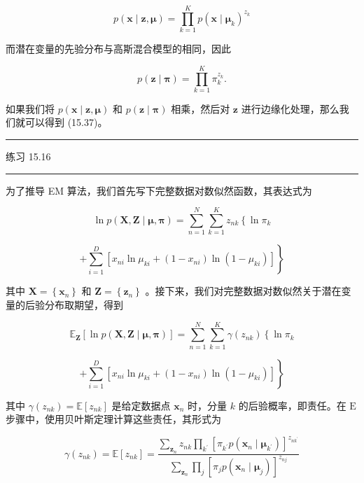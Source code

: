 \documentclass[10pt]{report}
\newcommand{\HRule}{\begin{center}\rule{0.9\linewidth}{0.2mm}\end{center}}
\begin{document}
\[
p\left( {\mathbf{x} \mid  \mathbf{z},\mathbf{\mu }}\right)  = \mathop{\prod }\limits_{{k = 1}}^{K}p{\left( \mathbf{x} \mid  {\mathbf{\mu }}_{k}\right) }^{{z}_{k}} \tag{15.42}
\]

而潜在变量的先验分布与高斯混合模型的相同，因此

\[
p\left( {\mathbf{z} \mid  \mathbf{\pi }}\right)  = \mathop{\prod }\limits_{{k = 1}}^{K}{\pi }_{k}^{{z}_{k}}. \tag{15.43}
\]

如果我们将 \(p\left( {\mathbf{x} \mid  \mathbf{z},\mathbf{\mu }}\right)\) 和 \(p\left( {\mathbf{z} \mid  \mathbf{\pi }}\right)\) 相乘，然后对 \(\mathbf{z}\) 进行边缘化处理，那么我们就可以得到 (15.37)。

\HRule

练习 15.16

\HRule

为了推导 EM 算法，我们首先写下完整数据对数似然函数，其表达式为

\[
\ln p\left( {\mathbf{X},\mathbf{Z} \mid  \mathbf{\mu },\mathbf{\pi }}\right)  = \mathop{\sum }\limits_{{n = 1}}^{N}\mathop{\sum }\limits_{{k = 1}}^{K}{z}_{nk}\left\{  {\ln {\pi }_{k}}\right.
\]

\[
\left. {+\mathop{\sum }\limits_{{i = 1}}^{D}\left\lbrack  {{x}_{ni}\ln {\mu }_{ki} + \left( {1 - {x}_{ni}}\right) \ln \left( {1 - {\mu }_{ki}}\right) }\right\rbrack  }\right\}   \tag{15.44}
\]

其中 \(\mathbf{X} = \left\{  {\mathbf{x}}_{n}\right\}\) 和 \(\mathbf{Z} = \left\{  {\mathbf{z}}_{n}\right\}\) 。接下来，我们对完整数据对数似然关于潜在变量的后验分布取期望，得到

\[
{\mathbb{E}}_{\mathbf{Z}}\left\lbrack  {\ln p\left( {\mathbf{X},\mathbf{Z} \mid  \mathbf{\mu },\mathbf{\pi }}\right) }\right\rbrack   = \mathop{\sum }\limits_{{n = 1}}^{N}\mathop{\sum }\limits_{{k = 1}}^{K}\gamma \left( {z}_{nk}\right) \left\{  {\ln {\pi }_{k}}\right.
\]

\[
\left. {+\mathop{\sum }\limits_{{i = 1}}^{D}\left\lbrack  {{x}_{ni}\ln {\mu }_{ki} + \left( {1 - {x}_{ni}}\right) \ln \left( {1 - {\mu }_{ki}}\right) }\right\rbrack  }\right\}   \tag{15.45}
\]

其中 \(\gamma \left( {z}_{nk}\right)  = \mathbb{E}\left\lbrack  {z}_{nk}\right\rbrack\) 是给定数据点 \({\mathbf{x}}_{n}\) 时，分量 \(k\) 的后验概率，即责任。在 \(\mathrm{E}\) 步骤中，使用贝叶斯定理计算这些责任，其形式为

\[
\gamma \left( {z}_{nk}\right)  = \mathbb{E}\left\lbrack  {z}_{nk}\right\rbrack   = \frac{\mathop{\sum }\limits_{{\mathbf{z}}_{n}}{z}_{nk}\mathop{\prod }\limits_{{k}^{\prime }}{\left\lbrack  {\pi }_{{k}^{\prime }}p\left( {\mathbf{x}}_{n} \mid  {\mathbf{\mu }}_{{k}^{\prime }}\right) \right\rbrack  }^{{z}_{n{k}^{\prime }}}}{\mathop{\sum }\limits_{{\mathbf{z}}_{n}}\mathop{\prod }\limits_{j}{\left\lbrack  {\pi }_{j}p\left( {\mathbf{x}}_{n} \mid  {\mathbf{\mu }}_{j}\right) \right\rbrack  }^{{z}_{nj}}}
\]
\end{document}
